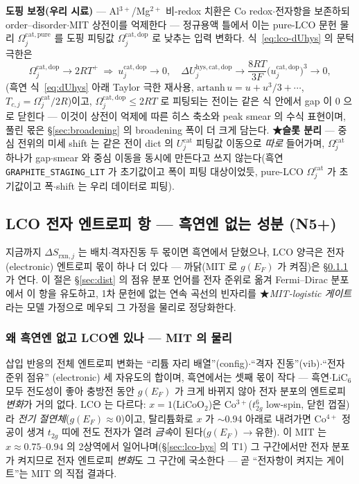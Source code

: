 \documentclass[11pt,a4paper]{article}
\newcommand{\rxn}{\mathrm{rxn}}
\newcommand{\hys}{\mathrm{hys}}
\newcommand{\code}[1]{\texttt{#1}}
\begin{document}
\textbf{도핑 보정(우리 시료)} —
Al$^{3+}$/Mg$^{2+}$ 비-redox 치환은 Co redox$\cdot$전자항을 보존하되 order--disorder$\cdot$MIT 상전이를
억제한다 — 정규용액 틀에서 이는 pure-LCO 문헌 물리 $\Omega_j^\mathrm{cat,pure}$ 를 도핑 피팅값
$\Omega_j^\mathrm{cat,dop}$ 로 낮추는 입력 변화다. 식~\eqref{eq:lco-dUhys} 의 문턱 극한은
\begin{equation}
\Omega_j^\mathrm{cat,dop}\to2RT^+\ \Longrightarrow\
u_j^\mathrm{cat,dop}\to0,\quad
\Delta U_j^{\hys,\mathrm{cat,dop}}\to\frac{8RT}{3F}\big(u_j^\mathrm{cat,dop}\big)^3\to0,
\label{eq:lco-dope}
\end{equation}
(흑연 식~\eqref{eq:dUhys} 아래 Taylor 극한 재사용, $\mathrm{artanh}\,u=u+u^3/3+\cdots$,
$T_{c,j}=\Omega_j^\mathrm{cat}/2R$)이고, $\Omega_j^\mathrm{cat,dop}\le2RT$ 로 피팅되는 전이는 같은 식 안에서
gap 이 0 으로 닫힌다 — 이것이 상전이 억제에 따른 히스 축소와 peak smear 의 수식 표현이며, 풀린 몫은
\S\ref{sec:broadening} 의 broadening 폭이 더 크게 담는다. \textbf{★슬롯 분리} — 중심 전위의 미세 shift 는
같은 전이 dict 의 $U_j^\mathrm{cat}$ 피팅값 이동으로 \emph{따로} 들어가며, $\Omega_j^\mathrm{cat}$ 하나가
gap$\cdot$smear 와 중심 이동을 동시에 만든다고 쓰지 않는다(흑연 \code{GRAPHITE\_STAGING\_LIT} 가 초기값이고
폭이 피팅 대상이었듯, pure-LCO $\Omega_j^\mathrm{cat}$ 가 초기값이고 폭$\cdot$shift 는 우리 데이터로 피팅).

\subsection{LCO 전자 엔트로피 항 — 흑연엔 없는 성분 (N5+)}\label{sec:lco-electronic}
지금까지 $\Delta S_{\rxn,j}$ 는 배치$\cdot$격자진동 두 몫이면 흑연에서 닫혔으나, LCO 양극은 전자(electronic) 엔트로피
몫이 하나 더 있다 — 까닭(MIT 로 $g(E_F)$ 가 켜짐)은 \S\ref{sec:lco-why} 가 연다.
이 절은 \S\ref{sec:dist} 의 점유 분포 언어를 전자 준위로 옮겨 Fermi--Dirac 분포에서 이 항을 유도하고,
1차 문헌에 없는 연속 곡선의 빈자리를 ★\emph{MIT-logistic 게이트}라는 모델 가정으로 메우되 그 가정을 물리로
정당화한다.

\subsubsection{왜 흑연엔 없고 LCO엔 있나 — MIT 의 물리}\label{sec:lco-why}
삽입 반응의 전체 엔트로피 변화는 ``리튬 자리 배열''(config)$\cdot$``격자 진동''(vib)$\cdot$``전자 준위 점유''
(electronic) 세 자유도의 합이며, 흑연에서는 셋째 몫이 작다 — 흑연$\cdot$$\mathrm{LiC_6}$ 모두 전도성이 좋아
충방전 동안 $g(E_F)$ 가 크게 바뀌지 않아 전자 분포의 엔트로피 \emph{변화}가 거의 없다. LCO 는 다르다:
$x{=}1$($\mathrm{LiCoO_2}$)은 Co$^{3+}$($t_{2g}^6$ low-spin, 닫힌 껍질)라 \emph{전기 절연체}($g(E_F)\!\approx\!0$)이고,
탈리튬화로 $x$ 가 $\sim$0.94 아래로 내려가면 Co$^{4+}$ 정공이 생겨 $t_{2g}$ 띠에 전도 전자가 열려 \emph{금속}이
된다($g(E_F)\!\to\!$유한)\cite{menetrier1999,motohashi2009}. 이 MIT 는 $x\approx0.75$--$0.94$ 의 2상역에서
일어나며(\S\ref{sec:lco-hys} 의 T1) 그 구간에서만 전자 분포가 켜지므로 전자 엔트로피 \emph{변화}도 그 구간에
국소한다 — 곧 ``전자항이 켜지는 게이트''는 MIT 의 직접 결과다.
\end{document}
